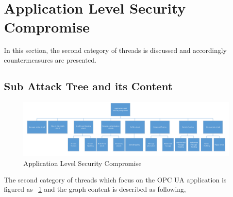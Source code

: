 \section{Application Level Security Compromise}
In this section, the second category of threads is discussed and accordingly countermeasures are presented.  
\subsection{Sub Attack Tree and its Content}
 \begin{figure}[!htb]
	\centering
	\includegraphics[width=1.2\textwidth]{attack-tree-application}
		\caption{Application Level Security Compromise}
	\label{fig:attack-tree-application}
\end{figure}
The second category of threads which focus on the OPC UA application is figured as ~\ref{fig:attack-tree-application} and  the graph content is described as following,

